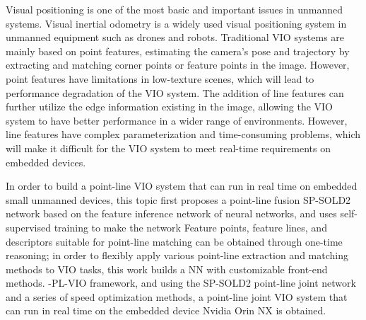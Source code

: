 \begin{abstract*}

  Visual positioning is one of the most basic and important issues in unmanned systems. Visual inertial odometry is a widely used visual positioning system in unmanned equipment such as drones and robots. Traditional VIO systems are mainly based on point features, estimating the camera's pose and trajectory by extracting and matching corner points or feature points in the image. However, point features have limitations in low-texture scenes, which will lead to performance degradation of the VIO system. The addition of line features can further utilize the edge information existing in the image, allowing the VIO system to have better performance in a wider range of environments. However, line features have complex parameterization and time-consuming problems, which will make it difficult for the VIO system to meet real-time requirements on embedded devices.

  In order to build a point-line VIO system that can run in real time on embedded small unmanned devices, this topic first proposes a point-line fusion SP-SOLD2 network based on the feature inference network of neural networks, and uses self-supervised training to make the network Feature points, feature lines, and descriptors suitable for point-line matching can be obtained through one-time reasoning; in order to flexibly apply various point-line extraction and matching methods to VIO tasks, this work builds a NN with customizable front-end methods. -PL-VIO framework, and using the SP-SOLD2 point-line joint network and a series of speed optimization methods, a point-line joint VIO system that can run in real time on the embedded device Nvidia Orin NX is obtained.

\end{abstract*}
